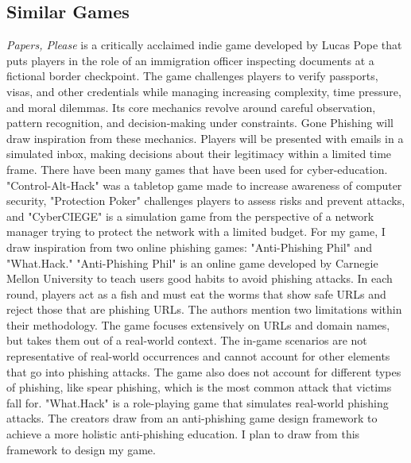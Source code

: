 \documentclass[10pt,twocolumn]{article}
\begin{document}
\subsection{Similar Games}
\textit{Papers, Please} is a critically acclaimed indie game developed by Lucas Pope that puts players in the role of an immigration officer inspecting documents at a fictional border checkpoint. The game challenges players to verify passports, visas, and other credentials while managing increasing complexity, time pressure, and moral dilemmas. Its core mechanics revolve around careful observation, pattern recognition, and decision-making under constraints. Gone Phishing will draw inspiration from these mechanics. Players will be presented with emails in a simulated inbox, making decisions about their legitimacy within a limited time frame.
There have been many games that have been used for cyber-education. "Control-Alt-Hack" was a tabletop game made to increase awareness of computer security\cite{control-alt-hack_2013}, "Protection Poker" challenges players to assess risks and prevent attacks\cite{protection_poker}, and "CyberCIEGE" is a simulation game from the perspective of a network manager trying to protect the network with a limited budget.\cite{ciege_2005} For my game, I draw inspiration from two online phishing games: "Anti-Phishing Phil"\cite{anti-phishing_phil} and "What.Hack."\cite{whathack_2019} "Anti-Phishing Phil" is an online game developed by Carnegie Mellon University to teach users good habits to avoid phishing attacks. In each round, players act as a fish and must eat the worms that show safe URLs and reject those that are phishing URLs. The authors mention two limitations within their methodology. The game focuses extensively on URLs and domain names, but takes them out of a real-world context. The in-game scenarios are not representative of real-world occurrences and cannot account for other elements that go into phishing attacks. The game also does not account for different types of phishing, like spear phishing, which is the most common attack that victims fall for. \cite{using_2018}
"What.Hack" is a role-playing game that simulates real-world phishing attacks. The creators draw from an anti-phishing game design framework to achieve a more holistic anti-phishing education. I plan to draw from this framework to design my game.
\end{document}

